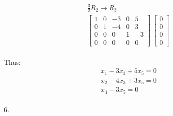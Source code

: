\documentclass[11pt]{article}
\begin{document}
\begin{flushleft}
\begin{align*}
&\frac{3}{2}R_2 \rightarrow R_3 \\
&\begin{bmatrix}
1 & 0 & -3 & 0 & 5 \\
0 & 1 & -4 & 0 & 3 \\
0 & 0 & 0 & 1 & -3 \\
0 & 0 & 0 & 0 & 0
\end{bmatrix}\
\begin{bmatrix}
0 \\ 0 \\ 0 \\ 0
\end{bmatrix}\\
\end{align*}

Thus:
\begin{align*}
&x_1 -3x_3 + 5x_5 = 0 \\
&x_2 -4x_3 +3x_5 = 0 \\
&x_4 -3x_5 = 0\\
\end{align*}

\newpage

6.


\end{flushleft}
\end{document}
